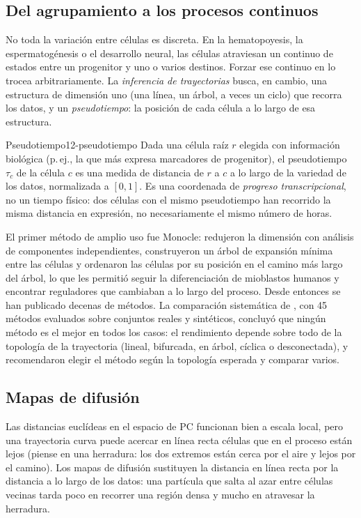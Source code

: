 \subsection{Del agrupamiento a los procesos continuos}

No toda la variación entre células es discreta. En la hematopoyesis, la espermatogénesis o el desarrollo neural, las células atraviesan un continuo de estados entre un progenitor y uno o varios destinos. Forzar ese continuo en  lo trocea arbitrariamente. La \emph{inferencia de trayectorias} busca, en cambio, una estructura de dimensión uno (una línea, un árbol, a veces un ciclo) que recorra los datos, y un \emph{pseudotiempo}: la posición de cada célula a lo largo de esa estructura.

\begin{definicion}{Pseudotiempo}{12-pseudotiempo}
Dada una célula raíz $r$ elegida con información biológica (p.\,ej., la que más expresa marcadores de progenitor), el pseudotiempo $\tau_c$ de la célula $c$ es una medida de distancia de $r$ a $c$ a lo largo de la variedad de los datos, normalizada a $[0,1]$. Es una coordenada de \emph{progreso transcripcional}, no un tiempo físico: dos células con el mismo pseudotiempo han recorrido la misma distancia en expresión, no necesariamente el mismo número de horas.
\end{definicion}

El primer método de amplio uso fue Monocle: \textcite{c12-trapnell2014} redujeron la dimensión con análisis de componentes independientes, construyeron un árbol de expansión mínima entre las células y ordenaron las células por su posición en el camino más largo del árbol, lo que les permitió seguir la diferenciación de mioblastos humanos y encontrar reguladores que cambiaban a lo largo del proceso. Desde entonces se han publicado decenas de métodos. La comparación sistemática de \textcite{c12-saelens2019}, con 45 métodos evaluados sobre conjuntos reales y sintéticos, concluyó que ningún método es el mejor en todos los casos: el rendimiento depende sobre todo de la topología de la trayectoria (lineal, bifurcada, en árbol, cíclica o desconectada), y recomendaron elegir el método según la topología esperada y comparar varios.

\subsection{Mapas de difusión}

Las distancias euclídeas en el espacio de PC funcionan bien a escala local, pero una trayectoria curva puede acercar en línea recta células que en el proceso están lejos (piense en una herradura: los dos extremos están cerca por el aire y lejos por el camino). Los mapas de difusión sustituyen la distancia en línea recta por la distancia a lo largo de los datos: una partícula que salta al azar entre células vecinas tarda poco en recorrer una región densa y mucho en atravesar la herradura.

